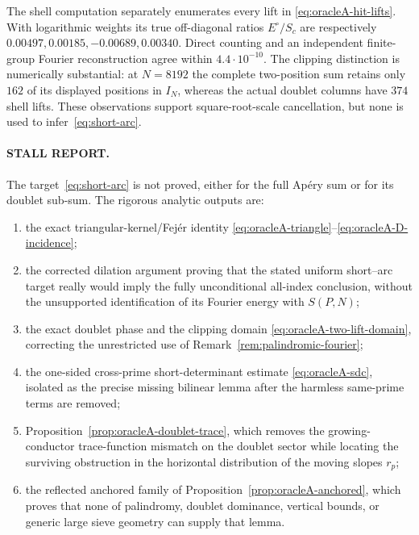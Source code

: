 The shell computation separately enumerates every lift in
\eqref{eq:oracleA-hit-lifts}.  With logarithmic weights its true
off-diagonal ratios $E^\circ/S_c$ are respectively
$0.00497,0.00185,-0.00689,0.00340$.  Direct counting and an independent
finite-group Fourier reconstruction agree within $4.4\cdot10^{-10}$.
The clipping distinction is numerically substantial: at $N=8192$ the
complete two-position sum retains only $162$ of its displayed positions
in $I_N$, whereas the actual doublet columns have $374$ shell lifts.
These observations support square-root-scale cancellation, but none is
used to infer~\eqref{eq:short-arc}.

\paragraph{STALL REPORT.}
The target~\eqref{eq:short-arc} is not proved, either for the full Ap\'ery
sum or for its doublet sub-sum.  The rigorous analytic outputs are:
\begin{enumerate}
 \item the exact triangular-kernel/Fej\'er identity
       \eqref{eq:oracleA-triangle}--\eqref{eq:oracleA-D-incidence};
 \item the corrected dilation argument proving that the stated uniform
       short--arc target really would imply the fully unconditional
       all-index conclusion, without the unsupported identification of
       its Fourier energy with $S(P,N)$;
 \item the exact doublet phase and the clipping domain
       \eqref{eq:oracleA-two-lift-domain}, correcting the unrestricted
       use of Remark~\ref{rem:palindromic-fourier};
 \item the one-sided cross-prime short-determinant estimate
       \eqref{eq:oracleA-sdc}, isolated as the precise missing bilinear
       lemma after the harmless same-prime terms are removed;
 \item Proposition~\ref{prop:oracleA-doublet-trace}, which removes the
       growing-conductor trace-function mismatch on the doublet sector
       while locating the surviving obstruction in the horizontal
       distribution of the moving slopes $r_p$;
 \item the reflected anchored family of
       Proposition~\ref{prop:oracleA-anchored}, which proves that none of
       palindromy, doublet dominance, vertical bounds, or generic large
       sieve geometry can supply that lemma.
\end{enumerate}
